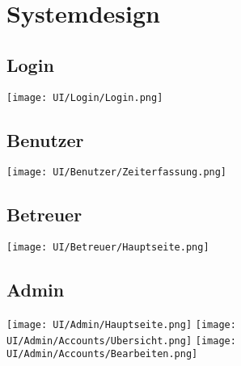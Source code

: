 \section{Systemdesign}

\subsection{Login}
\texttt{[image: UI/Login/Login.png]}

\subsection{Benutzer}
\texttt{[image: UI/Benutzer/Zeiterfassung.png]}

\subsection{Betreuer}
\texttt{[image: UI/Betreuer/Hauptseite.png]}

\subsection{Admin}
\texttt{[image: UI/Admin/Hauptseite.png]}
\texttt{[image: UI/Admin/Accounts/Ubersicht.png]}
\texttt{[image: UI/Admin/Accounts/Bearbeiten.png]}
